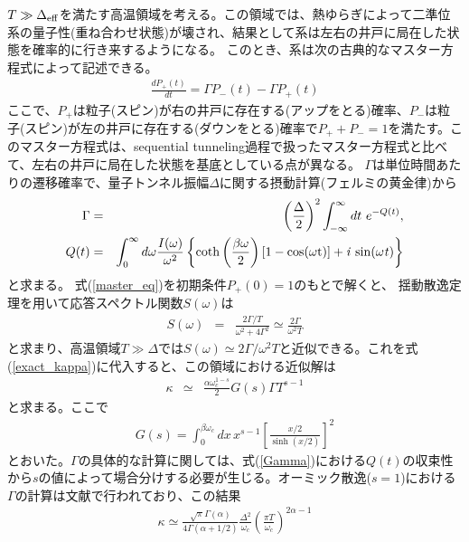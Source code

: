 $T\gg\Delta_{\rm eff}$を満たす高温領域を考える。この領域では、熱ゆらぎによって二準位系の量子性(重ね合わせ状態)が壊され、結果として系は左右の井戸に局在した状態を確率的に行き来するようになる。
このとき、系は次の古典的なマスター方程式によって記述できる。
\begin{eqnarray}
	\frac{dP_+(t)}{dt}=\Gamma P_-(t) - \Gamma P_+(t) 
	\label{master_eq}
\end{eqnarray}
ここで、${P}_+$は粒子(スピン)が右の井戸に存在する(アップをとる)確率、${P}_-$は粒子(スピン)が左の井戸に存在する(ダウンをとる)確率で$P_++P_-=1$を満たす。このマスター方程式は、sequential tunneling過程で扱ったマスター方程式と比べて、左右の井戸に局在した状態を基底としている点が異なる。
$\Gamma$は単位時間あたりの遷移確率で、量子トンネル振幅$\Delta$に関する摂動計算(フェルミの黄金律)から
\begin{eqnarray}
	\Gamma&=&\left({\frac{\Delta}{2}}\right)^2\int_{-\infty}^{\infty}dt \ e^{-Q(t)},\label{Gamma} \\
	Q(t)&=&\int_{0}^{\infty}d\omega \frac{I(\omega)}{\omega^2}\left \{ \mathrm{coth\left(\frac{\beta \omega}{2}\right)[1-\mathrm{cos}(\omega t)]+\it{i} \ \mathrm{ sin}(\omega t)}\right \}
\end{eqnarray}
と求まる\cite{Leggett87}。
式(\ref{master_eq})を初期条件$P_+(0)=1$のもとで解くと、
揺動散逸定理を用いて応答スペクトル関数$S(\omega)$は
\begin{eqnarray}
	S(\omega)&=&\frac{2\Gamma/T}{\omega^2+4\Gamma^2}\simeq \frac{2\Gamma}{\omega^2T}
\end{eqnarray}
と求まり、高温領域$T\gg\Delta$では$S(\omega)\simeq 2\Gamma/\omega^2T$と近似できる。これを式(\ref{exact_kappa})に代入すると、この領域における近似解は
\begin{eqnarray}
	\kappa&\simeq&\frac{\alpha\omega_c^{1-s}}{2}G(s)\Gamma T^{s-1} 
	\label{sub_ohmic_hightemp}
\end{eqnarray}
と求まる。ここで
\begin{eqnarray}
	G(s)=\int_{0}^{\beta \omega_c}dx\, x^{s-1}\left[\frac{x/2}{\sinh{(x/2)}}\right]^{2}
\end{eqnarray}
とおいた。$\Gamma$の具体的な計算に関しては、式(\ref{Gamma})における$Q(t)$の収束性から$s$の値によって場合分けする必要が生じる。オーミック散逸($s=1$)における$\Gamma$の計算は文献\cite{Weiss99}で行われており、この結果
\begin{eqnarray}
	\kappa\simeq\frac{\sqrt{\pi}\Gamma(\alpha)}{4\Gamma(\alpha+1/2)}\frac{\Delta^2}{\omega_c}\left(\frac{\pi T}{\omega_c}\right)^{2\alpha-1}
	\label{ohmic_incoherent}
\end{eqnarray}
